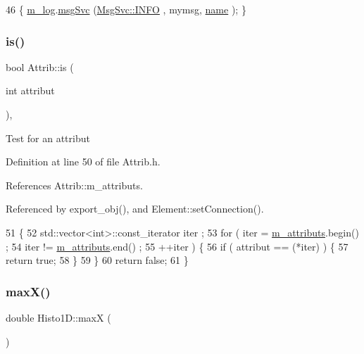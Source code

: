 \begin{DoxyCode}
46 \{ \hyperlink{classObject_a0d269813dd7ac1f24bc143031e2963f2}{m\_log}.\hyperlink{classMsgSvc_ad25f18047920cc59a314e5098259711c}{msgSvc} (\hyperlink{classMsgSvc_ae671eb7301996cd049d2da8a65925926ad2fcf3f3e734fc41ee097cc23670ce51}{MsgSvc::INFO}    , mymsg, \hyperlink{classObject_a300f4c05dd468c7bb8b3c968868443c1}{name} ); \}
\end{DoxyCode}
\mbox{\label{classAttrib_a704f26af560909ad22065083bb7d4c34}} 
\subsubsection{\texorpdfstring{is()}{is()}}
{\footnotesize\ttfamily bool Attrib\+::is (\begin{DoxyParamCaption}\item[{int}]{attribut }\end{DoxyParamCaption})\hspace{0.3cm}{\ttfamily [inline]}, {\ttfamily [inherited]}}

Test for an attribut 

Definition at line 50 of file Attrib.\+h.



References Attrib\+::m\+\_\+attributs.



Referenced by export\+\_\+obj(), and Element\+::set\+Connection().


\begin{DoxyCode}
51   \{
52     std::vector<int>::const\_iterator iter ;
53     \textcolor{keywordflow}{for} ( iter  = \hyperlink{classAttrib_ac4bd58a0cc6b38a3b711d609a3d3aacc}{m\_attributs}.begin() ;
54           iter != \hyperlink{classAttrib_ac4bd58a0cc6b38a3b711d609a3d3aacc}{m\_attributs}.end()   ;
55           ++iter ) \{
56       \textcolor{keywordflow}{if} ( attribut == (*iter) ) \{
57         \textcolor{keywordflow}{return} \textcolor{keyword}{true};
58       \}
59     \}
60     \textcolor{keywordflow}{return} \textcolor{keyword}{false};
61   \}
\end{DoxyCode}
\mbox{\label{classHisto1D_a54c7464513d1382c7c66fa880bfe568e}} 
\subsubsection{\texorpdfstring{max\+X()}{maxX()}}
{\footnotesize\ttfamily double Histo1\+D\+::maxX (\begin{DoxyParamCaption}{ }\end{DoxyParamCaption})\hspace{0.3cm}{\ttfamily [inline]}}



